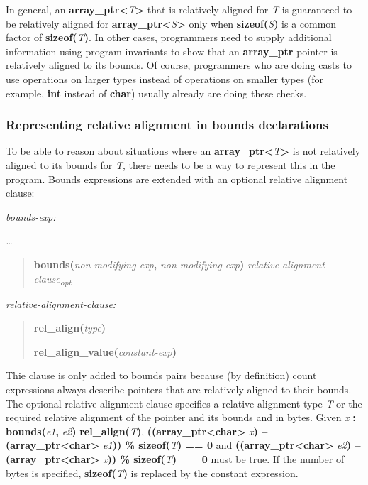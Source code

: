 \documentclass[]{article}
\begin{document}
In general, an
\textbf{array\_ptr\textless{}}\emph{T}\textbf{\textgreater{}} that is
relatively aligned for \emph{T} is guaranteed to be relatively aligned
for \textbf{array\_ptr\textless{}}\emph{S}\textbf{\textgreater{}} only
when \textbf{sizeof(}\emph{S}\textbf{)} is a common factor of
\textbf{sizeof(}\emph{T}\textbf{)}. In other cases, programmers need to
supply additional information using program invariants to show that an
\textbf{array\_ptr} pointer is relatively aligned to its bounds. Of
course, programmers who are doing casts to use operations on larger
types instead of operations on smaller types (for example, \textbf{int}
instead of \textbf{char}) usually already are doing these checks.

\subsubsection{\texorpdfstring{\protect\hypertarget{ux5fToc437460760}{}{\protect\hypertarget{ux5fToc440445438}{}{\protect\hypertarget{ux5fToc440449220}{}{\protect\hypertarget{ux5fToc440551870}{}{}}}}Representing
relative alignment in bounds
declarations}{Representing relative alignment in bounds declarations}}\label{representing-relative-alignment-in-bounds-declarations}

To be able to reason about situations where an
\textbf{array\_ptr\textless{}}\emph{T}\textbf{\textgreater{}} is not
relatively aligned to its bounds for \emph{T}, there needs to be a way
to represent this in the program. Bounds expressions are extended with
an optional relative alignment clause:

\emph{bounds-exp:}

\emph{\ldots{}}

\begin{quote}
\textbf{bounds(}\emph{non-modifying-exp}\textbf{,}
\emph{non-modifying-exp}\textbf{)}
\emph{relative-alignment-clause\textsubscript{opt}}
\end{quote}

\emph{relative-alignment-clause:}

\begin{quote}
\textbf{rel\_align(}\emph{type}\textbf{)}

\textbf{rel\_align\_value(}\emph{constant-exp}\textbf{)}
\end{quote}

Thie clause is only added to bounds pairs because (by definition) count
expressions always describe pointers that are relatively aligned to
their bounds. The optional relative alignment clause specifies a
relative alignment type \emph{T} or the required relative alignment of
the pointer and its bounds and in bytes. Given \emph{x} \textbf{:}
\textbf{bounds(}\emph{e1}\textbf{,} \emph{e2}\textbf{)}
\textbf{rel\_align(}\emph{T}\textbf{)},
\textbf{((array\_ptr\textless{}char\textgreater{}} \emph{x}\textbf{) --
(array\_ptr\textless{}char\textgreater{}} \emph{e1}\textbf{)) \%
sizeof(}\emph{T}\textbf{) == 0} and
\textbf{((array\_ptr\textless{}char\textgreater{}} \emph{e2}\textbf{) --
(array\_ptr\textless{}char\textgreater{}} \emph{x}\textbf{)) \%
sizeof(}\emph{T}\textbf{) == 0} must be true. If the number of bytes is
specified, \textbf{sizeof(}\emph{T}\textbf{)} is replaced by the
constant expression.
\end{document}
